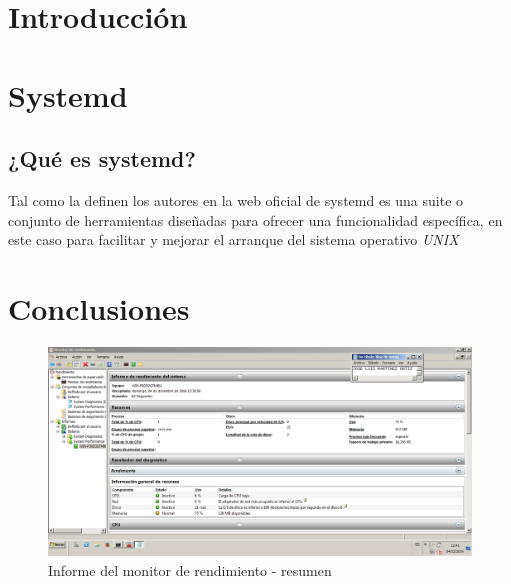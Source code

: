 
\section{Introducción} %



\section{Systemd} %
\subsection{¿Qué es systemd?}
Tal como la definen los autores en la web oficial de systemd \cite{systemd}
es una suite o conjunto de herramientas diseñadas para ofrecer una 
funcionalidad específica, en este caso para facilitar y mejorar el arranque
del sistema operativo \textit{UNIX}

\section{Conclusiones}

\begin{figure}[H] %
\centering
\includegraphics[scale=0.4]{./imagenes/P3_4_1.png} 
\caption{Informe del monitor de rendimiento - resumen} \label{fig:P3_4_1}
\end{figure}










